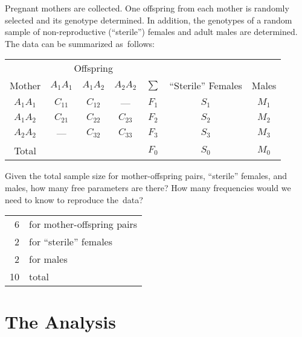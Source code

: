 \documentclass[12pt]{article}
\begin{document}
Pregnant mothers are collected.  One offspring from each mother is
randomly selected and its genotype determined.  In addition, the
genotypes of a random sample of non-reproductive (``sterile'') females
and adult males are determined. The data can be summarized as~follows:

\begin{center}
\begin{tabular}{c|ccc|c|cc}
\multicolumn{1}{c}{} & \multicolumn{3}{c}{Offspring} \\
Mother & $A_{1}A_{1}$ & $A_{1}A_{2}$ & $A_{2}A_{2}$ & $\sum$ 
       & ``Sterile'' Females & Males\\
\hline
$A_{1}A_{1}$ & $C_{11}$ & $C_{12}$ & ---      & $F_{1}$ & $S_{1}$ & $M_{1}$\\
$A_{1}A_{2}$ & $C_{21}$ & $C_{22}$ & $C_{23}$ & $F_{2}$ & $S_{2}$ & $M_{2}$\\
$A_{2}A_{2}$ & ---      & $C_{32}$ & $C_{33}$ & $F_{3}$ & $S_{3}$ & $M_{3}$\\
\hline
Total        &          &          &          & $F_{0}$ & $S_{0}$ & $M_{0}$\\
\end{tabular}
\end{center}

\noindent Given the total sample size for mother-offspring pairs,
``sterile'' females, and males, how many free parameters are there?
How many frequencies would we need to know to reproduce the~data?

\begin{center}
\begin{tabular}{rl}
6 & for mother-offspring pairs \\
2 & for ``sterile'' females \\
2 & for males \\
\hline 
10 & total \\
\end{tabular}
\end{center}

\section*{The Analysis}
\end{document}
